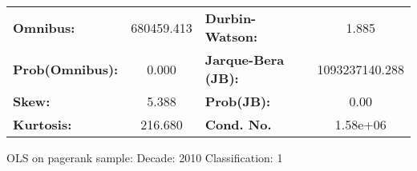 \begin{center}
\begin{tabular}{lccccc}
\bottomrule
\end{tabular}
\begin{tabular}{lclc}
\textbf{Omnibus:}       & 680459.413 & \textbf{  Durbin-Watson:     } &       1.885     \\
\textbf{Prob(Omnibus):} &    0.000   & \textbf{  Jarque-Bera (JB):  } & 1093237140.288  \\
\textbf{Skew:}          &    5.388   & \textbf{  Prob(JB):          } &        0.00     \\
\textbf{Kurtosis:}      &  216.680   & \textbf{  Cond. No.          } &    1.58e+06     \\
\bottomrule
\end{tabular}
\end{center}
\break
OLS on pagerank sample: Decade: 2010 Classification: 1

